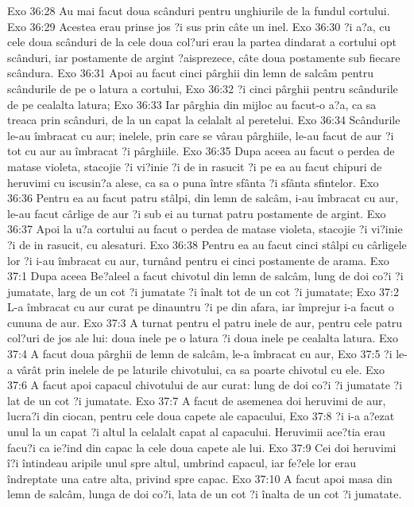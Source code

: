 Exo 36:28  Au mai facut doua scânduri pentru unghiurile de la fundul cortului.
Exo 36:29  Acestea erau prinse jos ?i sus prin câte un inel.
Exo 36:30  ?i a?a, cu cele doua scânduri de la cele doua col?uri erau la partea dindarat a cortului opt scânduri, iar postamente de argint ?aisprezece, câte doua postamente sub fiecare scândura.
Exo 36:31  Apoi au facut cinci pârghii din lemn de salcâm pentru scândurile de pe o latura a cortului,
Exo 36:32  ?i cinci pârghii pentru scândurile de pe cealalta latura;
Exo 36:33  Iar pârghia din mijloc au facut-o a?a, ca sa treaca prin scânduri, de la un capat la celalalt al peretelui.
Exo 36:34  Scândurile le-au îmbracat cu aur; inelele, prin care se vârau pârghiile, le-au facut de aur ?i tot cu aur au îmbracat ?i pârghiile.
Exo 36:35  Dupa aceea au facut o perdea de matase violeta, stacojie ?i vi?inie ?i de in rasucit ?i pe ea au facut chipuri de heruvimi cu iscusin?a alese, ca sa o puna între sfânta ?i sfânta sfintelor.
Exo 36:36  Pentru ea au facut patru stâlpi, din lemn de salcâm, i-au îmbracat cu aur, le-au facut cârlige de aur ?i sub ei au turnat patru postamente de argint.
Exo 36:37  Apoi la u?a cortului au facut o perdea de matase violeta, stacojie ?i vi?inie ?i de in rasucit, cu alesaturi.
Exo 36:38  Pentru ea au facut cinci stâlpi cu cârligele lor ?i i-au îmbracat cu aur, turnând pentru ei cinci postamente de arama.
Exo 37:1  Dupa aceea Be?aleel a facut chivotul din lemn de salcâm, lung de doi co?i ?i jumatate, larg de un cot ?i jumatate ?i înalt tot de un cot ?i jumatate;
Exo 37:2  L-a îmbracat cu aur curat pe dinauntru ?i pe din afara, iar împrejur i-a facut o cununa de aur.
Exo 37:3  A turnat pentru el patru inele de aur, pentru cele patru col?uri de jos ale lui: doua inele pe o latura ?i doua inele pe cealalta latura.
Exo 37:4  A facut doua pârghii de lemn de salcâm, le-a îmbracat cu aur,
Exo 37:5  ?i le-a vârât prin inelele de pe laturile chivotului, ca sa poarte chivotul cu ele.
Exo 37:6  A facut apoi capacul chivotului de aur curat: lung de doi co?i ?i jumatate ?i lat de un cot ?i jumatate.
Exo 37:7  A facut de asemenea doi heruvimi de aur, lucra?i din ciocan, pentru cele doua capete ale capacului,
Exo 37:8  ?i i-a a?ezat unul la un capat ?i altul la celalalt capat al capacului. Heruvimii ace?tia erau facu?i ca ie?ind din capac la cele doua capete ale lui.
Exo 37:9  Cei doi heruvimi î?i întindeau aripile unul spre altul, umbrind capacul, iar fe?ele lor erau îndreptate una catre alta, privind spre capac.
Exo 37:10  A facut apoi masa din lemn de salcâm, lunga de doi co?i, lata de un cot ?i înalta de un cot ?i jumatate.
